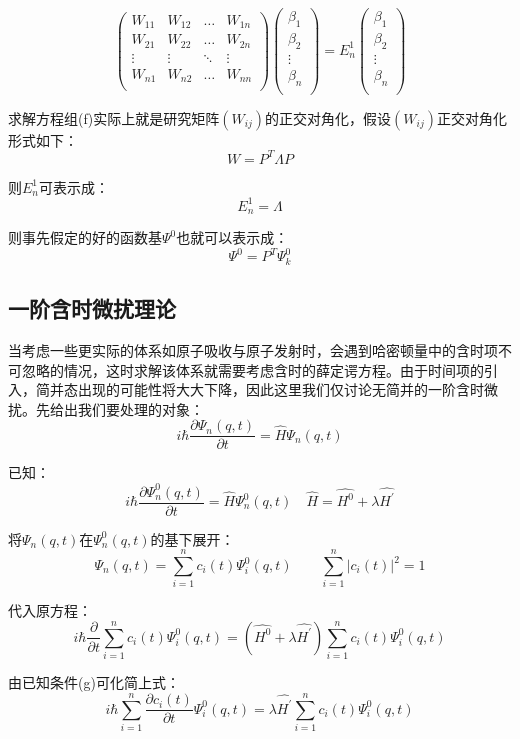 \[
\begin{pmatrix}
W_{11} & W_{12} & \ldots & W_{1n}\\
W_{21} & W_{22} & \ldots & W_{2n}\\
\vdots & \vdots & \ddots & \vdots\\
W_{n1} & W_{n2} & \ldots & W_{nn}\\
\end{pmatrix}
\begin{pmatrix}
\beta_1\\
\beta_2\\
\vdots\\
\beta_n\\
\end{pmatrix}
=E_n^1
\begin{pmatrix}
\beta_1\\
\beta_2\\
\vdots\\
\beta_n\\
\end{pmatrix}
\tag{f} \]

求解方程组(f)实际上就是研究矩阵$(W_{ij})$的正交对角化，假设$(W_{ij})$正交对角化形式如下：
\[W=P^T \Lambda P\]

则$E_n^1$可表示成：
\[E_n^1=\Lambda\]

则事先假定的好的函数基$\varPsi^0$也就可以表示成：
\[\varPsi^0=P^T \varPsi^0_k\]

\subsection{一阶含时微扰理论}
当考虑一些更实际的体系如原子吸收与原子发射时，会遇到哈密顿量中的含时项不可忽略的情况，这时求解该体系就需要考虑含时的薛定谔方程。由于时间项的引入，简并态出现的可能性将大大下降，因此这里我们仅讨论无简并的一阶含时微扰。先给出我们要处理的对象：
\[i \hbar \frac{\partial \varPsi_n(q,t)}{\partial t}=\hat{H} \varPsi_n(q,t)\]

已知：
\[i \hbar \frac{\partial \varPsi_n^0(q,t)}{\partial t}=\hat{H} \varPsi_n^0(q,t)\quad \hat{H}=\hat{H^0}+\lambda\hat{H^{'}}\tag{g}\]

将$\varPsi_n(q,t)$在$\varPsi_n^0(q,t)$的基下展开：
\[\varPsi_n(q,t)=\sum_{i=1}^nc_i(t)\varPsi_i^0(q,t) \qquad \sum_{i=1}^n|c_i(t)|^2=1\]

代入原方程：
\[i \hbar \frac{\partial}{\partial t}\sum_{i=1}^nc_i(t)\varPsi_i^0(q,t)=(\hat{H^0}+\lambda\hat{H^{'}}) \sum_{i=1}^nc_i(t)\varPsi_i^0(q,t)\]

由已知条件(g)可化简上式：
\[i \hbar \sum_{i=1}^n\frac{\partial c_i(t)}{\partial t}\varPsi_i^0(q,t)=\lambda\hat{H^{'}} \sum_{i=1}^nc_i(t)\varPsi_i^0(q,t)\]

